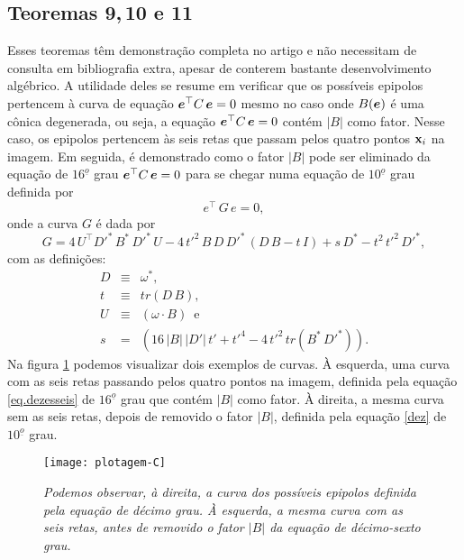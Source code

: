 \subsection*{Teoremas 9,\,10 e 11}
Esses teoremas têm demonstração completa no artigo e não necessitam de consulta em bibliografia extra, apesar de conterem bastante desenvolvimento algébrico. A utilidade deles se resume em verificar que os possíveis epipolos pertencem à curva de equação $\boldsymbol{e}^\top C\,\boldsymbol{e}=0$ mesmo no caso onde $B(\boldsymbol{e})$ é uma cônica degenerada, ou seja, a equação $\boldsymbol{e}^\top C\,\boldsymbol{e}=0$ contém $|B|$ como fator.   Nesse caso, os epipolos pertencem às seis retas que passam pelos quatro pontos $\mathbf{x}_i$ na imagem. Em seguida, é demonstrado como o fator $|B|$ pode ser eliminado da equação de $16^{\underline{o}}$ grau $\boldsymbol{e}^\top C\,\boldsymbol{e}=0$ para se chegar numa equação de $10^{\underline{o}}$ grau definida por
\begin{equation}
e^\top\,G\,e=0,
\label{dez}
\end{equation}
onde a curva $G$ é dada por
\begin{equation}
G=4\,U^\top D'^*\,B^*\,D'^*\,U-4\,t'^2\,B\,D\,D'^*\,(D\,B-t\,I)+s\,D^*-t^2\,t'^2\,D'^*,
\label{conica-G}
\end{equation}
com as definições:
\begin{equation*}
\begin{array}{rcl}
D&\equiv&\omega^*,\\
t&\equiv&tr(D\,B),\\
U&\equiv&(\omega \cdot B)\,\,\, \text{e}\\
s&=&(16\,|B|\,|D'|\,t'+t'^4-4\,t'^2\,tr(B^*\,D'^*)).
\end{array}
\end{equation*}
Na figura \ref{plot-C} podemos visualizar dois exemplos de curvas. À esquerda, uma curva com as seis retas passando pelos quatro pontos na imagem, definida pela equação \ref{eq.dezesseis} de $16^{\underline{o}}$ grau que contém $|B|$ como fator. À direita, a mesma curva sem as seis retas, depois de removido o fator $|B|$, definida pela equação \ref{dez} de $10^{\underline{o}}$ grau.   

\begin{figure}[!htb]
\centering
\texttt{[image: plotagem-C]}
\caption{\textit{Podemos observar, à direita, a curva dos possíveis epipolos definida pela equação de décimo grau. À esquerda, a mesma curva com as seis retas, antes de removido o fator $|B|$ da equação de décimo-sexto grau.}}
\label{plot-C}
\end{figure}

